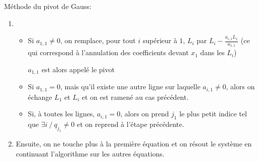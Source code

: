 \documentclass[../main.tex]{subfile}
\begin{document}
Méthode du pivot de Gauss:\\
\begin{enumerate}
	\item
\begin{itemize}
	\item Si $a_{1,1} \neq 0$, on remplace, pour tout $i$ supérieur à $1$, $L_i$ par $L_i - \frac{a_{i, 1}L_1}{a_{1,1}}$ 
	(ce qui correspond à l'annulation des coefficients devant $x_1$ dans les $L_i$)
	\begin{nota}
		$a_{1,1}$ est alors appelé le pivot
	\end{nota}

	\item Si $a_{1,1} = 0$, mais qu'il existe une autre ligne sur laquelle $a_{i,1} \neq 0$, 
	alors on échange $L_1$ et $L_i$ et on est ramené au cas précédent.

	\item Si, à toutes les lignes, $a_{i,1} = 0$, 
	alors on prend $j_1$ le plus petit indice tel que $\exists i \ / \ q_{j_1} \neq 0$ et on reprend à l'étape précédente.
\end{itemize}

	\item Ensuite, on ne touche plus à la première équation et on résout le système en continuant l'algorithme sur les autres équations.


\end{enumerate}
\end{document}
